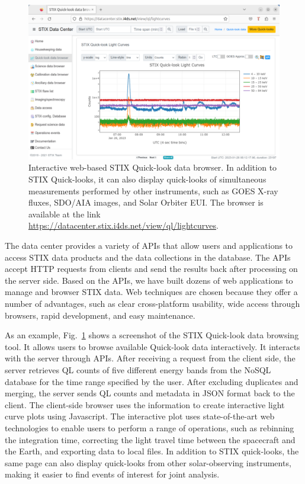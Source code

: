 \documentclass[referee]{aa} %
\begin{document}
\begin{figure}[h]
  \centering
  \includegraphics[width=0.7\linewidth]{figures/data-browser.pdf}
  \caption{ 
    Interactive web-based STIX Quick-look data browser. 
    In addition to STIX Quick-looks, it can also display quick-looks of simultaneous measurements 
    performed by other instruments, such as GOES X-ray fluxes, SDO/AIA images, and Solar Orbiter EUI. 
    The browser is available at the link \url{https://datacenter.stix.i4ds.net/view/ql/lightcurves}.}
  \label{fig:qlbrowser}
\end{figure}
The data center provides a variety of APIs that allow users and applications to access STIX data products
and the data collections in the database.
The APIs accept HTTP requests from clients and send the results back after processing on the server side. 
Based on the APIs, we have built dozens of web applications to manage and browser STIX data. 
Web techniques are chosen because they offer a number of advantages, such as clear cross-platform 
usability, wide access through browsers, rapid development, and easy maintenance.

As an example, Fig.~\ref{fig:qlbrowser} shows a screenshot of the STIX Quick-look data browsing 
tool. It allows users to browse available Quick-look data interactively. It 
interacts with the server through APIs. 
After receiving a request from the client side, the server retrieves QL counts of five different energy bands from the NoSQL database for the time range specified by the user. After excluding duplicates and merging, the server sends QL counts and metadata in JSON format back to the client. The client-side browser uses the information to create interactive light curve plots using Javascript. 
The interactive plot uses state-of-the-art web technologies to enable users to perform a range of operations, such as rebinning the integration time, correcting the light travel time between the spacecraft and the Earth, and exporting data to local files. In addition to STIX quick-looks, the same page can also display quick-looks from other solar-observing instruments, making it easier to find events of interest for joint analysis.
\end{document}
